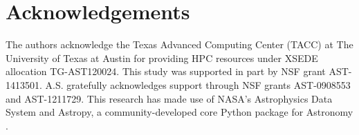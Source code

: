 \section*{Acknowledgements}
The authors acknowledge the Texas Advanced Computing Center (TACC) at The University of Texas at Austin for providing HPC resources under XSEDE allocation TG-AST120024. This study was supported in part by NSF grant AST-1413501. A.S. gratefully acknowledges support through NSF grants AST-0908553 and  AST-1211729. This research has made use of NASA's Astrophysics Data System and Astropy, a community-developed core Python package for Astronomy \citep{Robitailleetal2013}.